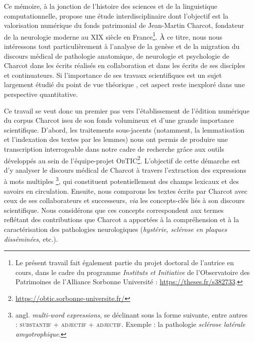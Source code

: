 \label{intro}
Ce mémoire, à la jonction de l'histoire des sciences et de la linguistique computationnelle, propose une étude interdisciplinaire dont l'objectif est la valorisation numérique du fonds patrimonial de Jean-Martin Charcot, fondateur de la neurologie moderne au XIX\ieme{} siècle en France\footnote{Le présent travail fait également partie du projet doctoral de l'autrice en cours, dans le cadre du programme \textit{Instituts et Initiative} de l'Observatoire des Patrimoines de l'Alliance Sorbonne Université : \url{https://theses.fr/s382733}.}. À ce titre, nous nous intéressons tout particulièrement à l'analyse de la genèse et de la migration du discours médical de pathologie anatomique, de neurologie et psychologie de Charcot dans les écrits réalisés en collaboration et dans les écrits de ses disciples et continuateurs. Si l'importance de ses travaux scientifiques est un sujet largement étudié du point de vue théorique \citep{bogousslavsky2011following,broussolle2012,camargo2024}, 
cet aspect reste inexploré dans une perspective quantitative.

Ce travail se veut donc un premier pas vers l'établissement de l'édition numérique du corpus Charcot issu de son fonds volumineux et d'une grande importance scientifique. D'abord, les traitements sous-jacents (notamment, la lemmatisation et l'indexation des textes par les lemmes) nous ont permis de produire une transcription interrogeable dans notre cadre de recherche grâce aux outils développés au sein de l'équipe-projet \textsc{ObTIC}\footnote{\url{https://obtic.sorbonne-universite.fr/}}. L'objectif de cette démarche est d'y analyser le discours médical de Charcot à travers l'extraction des expressions à mots multiples \citep[p. 96]{nerima2006}\footnote{angl. \textit{multi-word expressions}, se déclinant sous la forme suivante, entre autres : \textsc{substantif + adjectif + adjectif}. Exemple : la pathologie \textit{sclérose latérale amyotrophique}. 
}, qui constituent potentiellement des champs lexicaux et des savoirs en circulation. Ensuite, nous comparons les textes écrits par Charcot avec ceux de ses collaborateurs et successeurs, \textit{via} les concepts-clés liés à son discours scientifique. Nous considérons que ces concepts correspondent aux termes reflétant des contributions que Charcot a apportées à la compréhension et à la caractérisation des pathologies neurologiques (\textit{hystérie, sclérose en plaques disséminées}, etc.).

